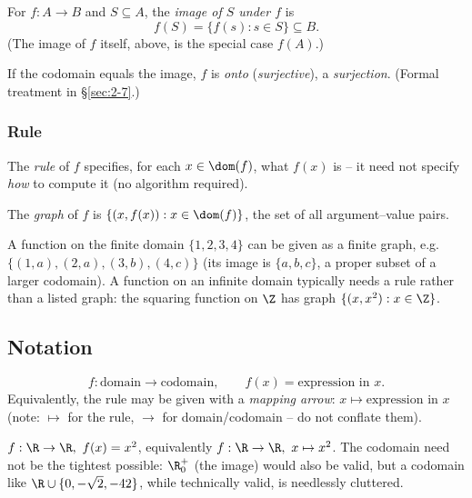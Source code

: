 \begin{definition}
For $f: A \to B$ and $S \subseteq A$, the \emph{image of $S$ under $f$} is
\[
f(S) = \{f(s) : s \in S\} \subseteq B.
\]
(The image of $f$ itself, above, is the special case $f(A)$.)
\end{definition}

\begin{note}
If the codomain equals the image, $f$ is \emph{onto} (\emph{surjective}), a \emph{surjection}. (Formal treatment in \S\ref{sec:2-7}.)
\end{note}

\subsubsection{Rule}
\label{sec:2-1-3}
\begin{definition}[Rule]
The \emph{rule} of $f$ specifies, for each $x \in \dom(f)$, what $f(x)$ is -- it need not specify \emph{how} to compute it (no algorithm required).
\end{definition}

\begin{definition}
The \emph{graph} of $f$ is $\{(x, f(x)) : x \in \dom(f)\}$, the set of all argument--value pairs.
\end{definition}

\begin{example}
A function on the finite domain $\{1,2,3,4\}$ can be given as a finite graph, e.g.\ $\{(1,a),(2,a),(3,b),(4,c)\}$ (its image is $\{a,b,c\}$, a proper subset of a larger codomain). A function on an infinite domain typically needs a rule rather than a listed graph: the squaring function on $\Z$ has graph $\{(x,x^2):x\in\Z\}$.
\end{example}

\subsection{Notation}
\label{sec:2-3}
\begin{definition}
\[
f : \text{domain} \to \text{codomain}, \qquad f(x) = \text{expression in } x.
\]
Equivalently, the rule may be given with a \emph{mapping arrow}: $x \mapsto \text{expression in } x$ (note: $\mapsto$ for the rule, $\to$ for domain/codomain -- do not conflate them).
\end{definition}

\begin{example}
$f : \R \to \R,\ f(x) = x^2$, equivalently $f: \R \to \R,\ x \mapsto x^2$. The codomain need not be the tightest possible: $\R_0^+$ (the image) would also be valid, but a codomain like $\R \cup \{0,-\sqrt2,-42\}$, while technically valid, is needlessly cluttered.
\end{example}

